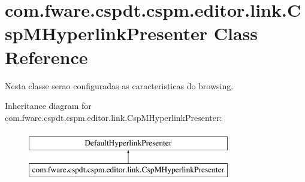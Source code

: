 \hypertarget{classcom_1_1fware_1_1cspdt_1_1cspm_1_1editor_1_1link_1_1_csp_m_hyperlink_presenter}{}\section{com.\+fware.\+cspdt.\+cspm.\+editor.\+link.\+Csp\+M\+Hyperlink\+Presenter Class Reference}
\label{classcom_1_1fware_1_1cspdt_1_1cspm_1_1editor_1_1link_1_1_csp_m_hyperlink_presenter}


Nesta classe serao configuradas as caracteristicas do browsing.  


Inheritance diagram for com.\+fware.\+cspdt.\+cspm.\+editor.\+link.\+Csp\+M\+Hyperlink\+Presenter\+:\begin{figure}[H]
\begin{center}
\leavevmode
\includegraphics[height=2.000000cm]{classcom_1_1fware_1_1cspdt_1_1cspm_1_1editor_1_1link_1_1_csp_m_hyperlink_presenter}
\end{center}
\end{figure}
